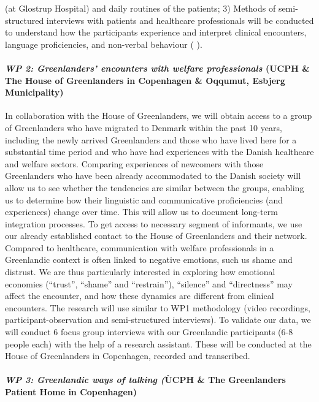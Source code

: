 \documentclass[twocolumn, serif, rga, authordate]{jote-article}
\begin{document}
(at Glostrup Hospital) and daily routines of the patients; 3) Methods of semi-structured interviews with patients and healthcare professionals will be conducted to understand how the participants experience and interpret clinical encounters, language proficiencies, and non-verbal behaviour ( \citeyear{Spradley1997}).

  \paragraph{\emph{WP 2: Greenlanders' encounters with welfare professionals} (UCPH \& The House of Greenlanders in Copenhagen \& Oqqumut, Esbjerg Municipality)}

In collaboration with the House of Greenlanders, we will obtain access to a group of Greenlanders who have migrated to Denmark within the past 10 years, including the newly arrived Greenlanders and those who have lived here for a substantial time period and who have had experiences with the Danish healthcare and welfare sectors. Comparing experiences of newcomers with those Greenlanders who have been already accommodated to the Danish society will allow us to see whether the tendencies are similar between the groups, enabling us to determine how their linguistic and communicative proficiencies (and experiences) change over time. This will allow us to document long-term integration processes. To get access to necessary segment of informants, we use our already established contact to the House of Greenlanders and their network.
Compared to healthcare, communication with welfare professionals in a Greenlandic context is often linked to negative emotions, such us shame and distrust. We are thus particularly interested in exploring how emotional economies (``trust'', ``shame'' and ``restrain''), ``silence''
and ``directness'' may affect the encounter, and how these dynamics are different from clinical encounters. The research will use similar to WP1 methodology (video recordings, participant-observation and semi-structured interviews). To validate our data, we will conduct 6 focus group interviews with our Greenlandic participants (6-8 people each) with the help of a research assistant. These will be conducted at the House of Greenlanders in Copenhagen, recorded and transcribed.

\paragraph{\emph{WP 3: Greenlandic ways of talking (}ÙCPH \& The Greenlanders Patient Home in Copenhagen)}
\end{document}
